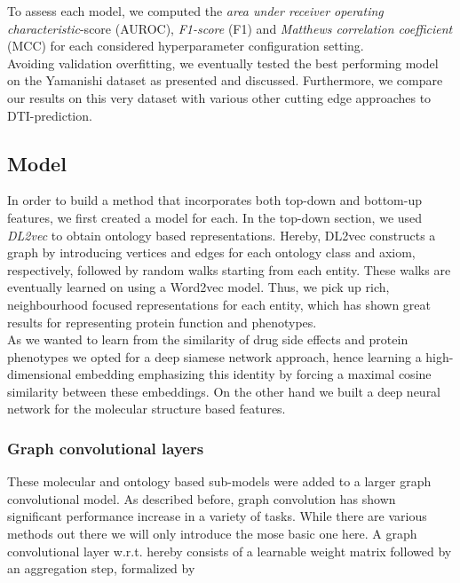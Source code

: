 \documentclass{bioinfo}
\begin{document}
To assess each model, we computed the \textit{area under receiver operating characteristic}-score (AUROC), \textit{F1-score} (F1) and \textit{Matthews correlation coefficient} (MCC) for each considered hyperparameter configuration setting.\\

Avoiding validation overfitting, we eventually tested the best performing model on the Yamanishi dataset as presented and discussed. Furthermore, we compare our results on this very dataset with various other cutting edge approaches to DTI-prediction.\\

\subsection{Model} 
In order to build a method that incorporates both top-down and bottom-up features, we first created a model for each. In the top-down section, we used \textit{DL2vec}\citep{DL2vec2020} to obtain ontology based representations. Hereby, DL2vec constructs a graph by introducing vertices and edges for each ontology class and axiom, respectively, followed by random walks starting from each entity. These walks are eventually learned on using a Word2vec \citep{Word2vec2013} model. Thus, we pick up rich, neighbourhood focused representations for each entity, which has shown great results for representing protein function and phenotypes. \\

As we wanted to learn from the similarity of drug side effects and protein phenotypes we opted for a deep siamese network approach, hence learning a high-dimensional embedding emphasizing this identity by forcing a maximal cosine similarity between these embeddings. On the other hand we built a deep neural network for the molecular structure based features. \\

\subsubsection{Graph convolutional layers}
These molecular and ontology based sub-models were added to a larger graph convolutional model.
As described before, graph convolution has shown significant performance increase in a variety of tasks. While there are various methods out there we will only introduce the mose basic one here. A graph convolutional layer w.r.t. \citet{GCNConv} hereby consists of a learnable weight matrix followed by an aggregation step, formalized by
\end{document}
